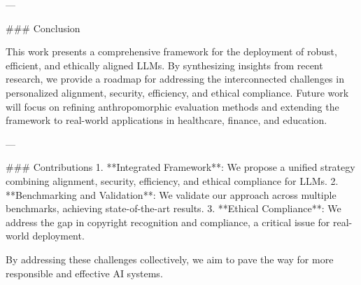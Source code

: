 ---

### Conclusion  

This work presents a comprehensive framework for the deployment of robust, efficient, and ethically aligned LLMs. By synthesizing insights from recent research, we provide a roadmap for addressing the interconnected challenges in personalized alignment, security, efficiency, and ethical compliance. Future work will focus on refining anthropomorphic evaluation methods and extending the framework to real-world applications in healthcare, finance, and education.

---

### Contributions  
1. **Integrated Framework**: We propose a unified strategy combining alignment, security, efficiency, and ethical compliance for LLMs.  
2. **Benchmarking and Validation**: We validate our approach across multiple benchmarks, achieving state-of-the-art results.  
3. **Ethical Compliance**: We address the gap in copyright recognition and compliance, a critical issue for real-world deployment.  

By addressing these challenges collectively, we aim to pave the way for more responsible and effective AI systems.